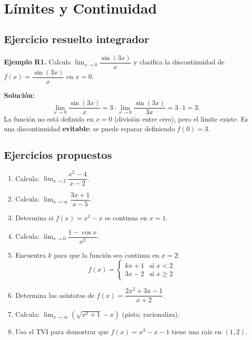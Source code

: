 \documentclass[12pt, letterpaper]{article}
\begin{document}
\newpage

\section{Límites y Continuidad}

\subsection{Ejercicio resuelto integrador}

\textbf{Ejemplo R1.} Calcula $\lim_{x \to 0} \dfrac{\sin(3x)}{x}$ y clasifica la discontinuidad de $f(x) = \dfrac{\sin(3x)}{x}$ en $x = 0$.

\begin{cuadrosolucion}
  \textbf{Solución:}
  $$\lim_{x \to 0} \dfrac{\sin(3x)}{x} = 3 \cdot \lim_{x \to 0} \dfrac{\sin(3x)}{3x} = 3 \cdot 1 = 3.$$
  La función no está definida en $x = 0$ (división entre cero), pero el límite existe. Es una discontinuidad \textbf{evitable}: se puede reparar definiendo $f(0) = 3$.
\end{cuadrosolucion}

\subsection{Ejercicios propuestos}

\begin{enumerate}[resume=ejercicios, leftmargin=*]
  \item \facil{} Calcula: $\lim_{x \to 2} \dfrac{x^2 - 4}{x - 2}$.

  \item \facil{} Calcula: $\lim_{x \to \infty} \dfrac{3x + 1}{x - 5}$.

  \item \facil{} Determina si $f(x) = x^3 - x$ es continua en $x = 1$.

  \item \medio{} Calcula: $\lim_{x \to 0} \dfrac{1 - \cos x}{x^2}$.

  \item \medio{} Encuentra $k$ para que la función sea continua en $x = 2$:
        $$f(x) = \begin{cases} kx + 1 & \text{si } x < 2 \\ 3x - 2 & \text{si } x \geq 2 \end{cases}$$

  \item \medio{} Determina las asíntotas de $f(x) = \dfrac{2x^2 + 3x - 1}{x + 2}$.

  \item \dificil{} Calcula: $\lim_{x \to \infty} \left(\sqrt{x^2 + 1} - x\right)$ (pista: racionaliza).

  \item \dificil{} Usa el TVI para demostrar que $f(x) = x^3 - x - 1$ tiene una raíz en $(1, 2)$.
\end{enumerate}
\end{document}
